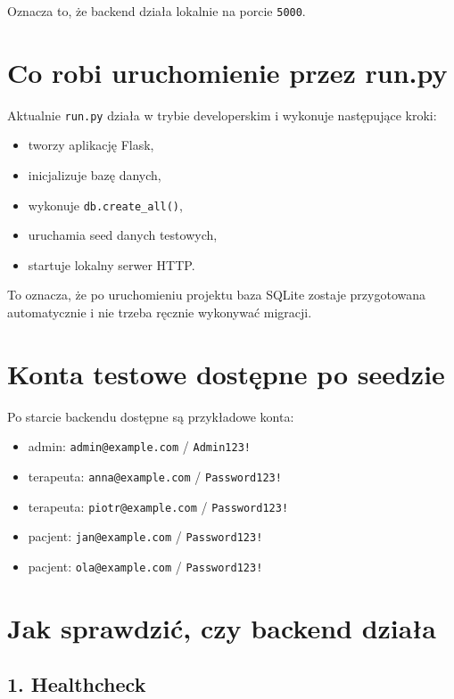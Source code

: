 \documentclass[11pt,a4paper]{article}
\begin{document}
Oznacza to, że backend działa lokalnie na porcie \texttt{5000}.

\section{Co robi uruchomienie przez run.py}

Aktualnie \texttt{run.py} działa w trybie developerskim i wykonuje następujące kroki:

\begin{itemize}[leftmargin=1.2cm]
    \item tworzy aplikację Flask,
    \item inicjalizuje bazę danych,
    \item wykonuje \texttt{db.create\_all()},
    \item uruchamia seed danych testowych,
    \item startuje lokalny serwer HTTP.
\end{itemize}

To oznacza, że po uruchomieniu projektu baza SQLite zostaje przygotowana automatycznie i nie trzeba ręcznie wykonywać migracji.

\section{Konta testowe dostępne po seedzie}

Po starcie backendu dostępne są przykładowe konta:

\begin{itemize}[leftmargin=1.2cm]
    \item admin: \texttt{admin@example.com} / \texttt{Admin123!}
    \item terapeuta: \texttt{anna@example.com} / \texttt{Password123!}
    \item terapeuta: \texttt{piotr@example.com} / \texttt{Password123!}
    \item pacjent: \texttt{jan@example.com} / \texttt{Password123!}
    \item pacjent: \texttt{ola@example.com} / \texttt{Password123!}
\end{itemize}

\section{Jak sprawdzić, czy backend działa}

\subsection{1. Healthcheck}
\end{document}
